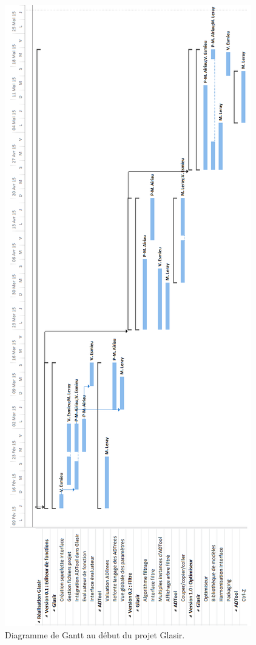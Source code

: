     \begin{figure}[H]
        \centering
        \includegraphics[height=1.6\textwidth]{figure/planifInit.png}
        \caption{Diagramme de Gantt au début du projet Glasir.}
        \label{fig:planifInit}
    \end{figure}

